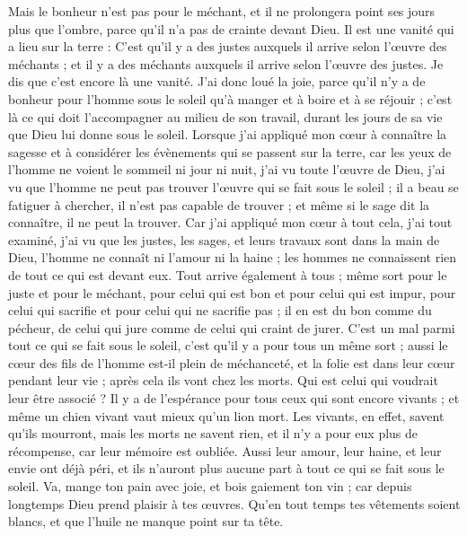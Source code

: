 \begin{multicols}{2}
Mais le bonheur n'est pas pour le méchant, et il ne prolongera point ses jours plus que l'ombre, parce qu'il n'a pas de crainte devant Dieu.
Il est une vanité qui a lieu sur la terre : C'est qu'il y a des justes auxquels il arrive selon l'œuvre des méchants ; et il y a des méchants auxquels il arrive selon l'œuvre des justes. Je dis que c'est encore là une vanité.
J'ai donc loué la joie, parce qu'il n'y a de bonheur pour l'homme sous le soleil qu'à manger et à boire et à se réjouir ; c'est là ce qui doit l'accompagner au milieu de son travail, durant les jours de sa vie que Dieu lui donne sous le soleil.
Lorsque j'ai appliqué mon cœur à connaître la sagesse et à considérer les évènements qui se passent sur la terre, car les yeux de l'homme ne voient le sommeil ni jour ni nuit,
j'ai vu toute l'œuvre de Dieu, j'ai vu que l'homme ne peut pas trouver l'œuvre qui se fait sous le soleil ; il a beau se fatiguer à chercher, il n'est pas capable de trouver ; et même si le sage dit la connaître, il ne peut la trouver.
\VerseOne{}Car j'ai appliqué mon cœur à tout cela, j'ai tout examiné, j'ai vu que les justes, les sages, et leurs travaux sont dans la main de Dieu, l'homme ne connaît ni l'amour ni la haine ; les hommes ne connaissent rien de tout ce qui est devant eux.
Tout arrive également à tous ; même sort pour le juste et pour le méchant, pour celui qui est bon et pour celui qui est impur, pour celui qui sacrifie et pour celui qui ne sacrifie pas ; il en est du bon comme du pécheur, de celui qui jure comme de celui qui craint de jurer.
C'est un mal parmi tout ce qui se fait sous le soleil, c'est qu'il y a pour tous un même sort ; aussi le cœur des fils de l'homme est-il plein de méchanceté, et la folie est dans leur cœur pendant leur vie ; après cela ils vont chez les morts. Qui est celui qui voudrait leur être associé ?
Il y a de l'espérance pour tous ceux qui sont encore vivants ; et même un chien vivant vaut mieux qu'un lion mort.
Les vivants, en effet, savent qu'ils mourront, mais les morts ne savent rien, et il n'y a pour eux plus de récompense, car leur mémoire est oubliée.
Aussi leur amour, leur haine, et leur envie ont déjà péri, et ils n'auront plus aucune part à tout ce qui se fait sous le soleil.
Va, mange ton pain avec joie, et bois gaiement ton vin ; car depuis longtemps Dieu prend plaisir à tes œuvres.
Qu'en tout temps tes vêtements soient blancs, et que l'huile ne manque point sur ta tête.

\end{multicols}
